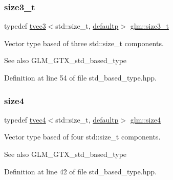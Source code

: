 \mbox{\label{group__gtx__std__based__type_ga689991bc66c16637f043ade5cbb87260}} 
\subsubsection{\texorpdfstring{size3\_t}{size3\_t}}
{\footnotesize\ttfamily typedef \mbox{\hyperlink{structglm_1_1tvec3}{tvec3}}$<$std\+::size\+\_\+t, \mbox{\hyperlink{namespaceglm_a0f04f086094c747d227af4425893f545a9d21ccd8b5a009ec7eb7677befc3bf51}{defaultp}}$>$ \mbox{\hyperlink{group__gtx__std__based__type_ga689991bc66c16637f043ade5cbb87260}{glm\+::size3\+\_\+t}}}

Vector type based of three std\+::size\+\_\+t components. \begin{DoxySeeAlso}{See also}
G\+L\+M\+\_\+\+G\+T\+X\+\_\+std\+\_\+based\+\_\+type 
\end{DoxySeeAlso}


Definition at line 54 of file std\+\_\+based\+\_\+type.\+hpp.

\mbox{\label{group__gtx__std__based__type_ga66a39603f01a37444de3adb28c021e79}} 
\subsubsection{\texorpdfstring{size4}{size4}}
{\footnotesize\ttfamily typedef \mbox{\hyperlink{structglm_1_1tvec4}{tvec4}}$<$std\+::size\+\_\+t, \mbox{\hyperlink{namespaceglm_a0f04f086094c747d227af4425893f545a9d21ccd8b5a009ec7eb7677befc3bf51}{defaultp}}$>$ \mbox{\hyperlink{group__gtx__std__based__type_ga66a39603f01a37444de3adb28c021e79}{glm\+::size4}}}

Vector type based of four std\+::size\+\_\+t components. \begin{DoxySeeAlso}{See also}
G\+L\+M\+\_\+\+G\+T\+X\+\_\+std\+\_\+based\+\_\+type 
\end{DoxySeeAlso}


Definition at line 42 of file std\+\_\+based\+\_\+type.\+hpp.

\mbox{\label{group__gtx__std__based__type_gaa4f69cfac1c3e014a50fd090974092ec}} 
